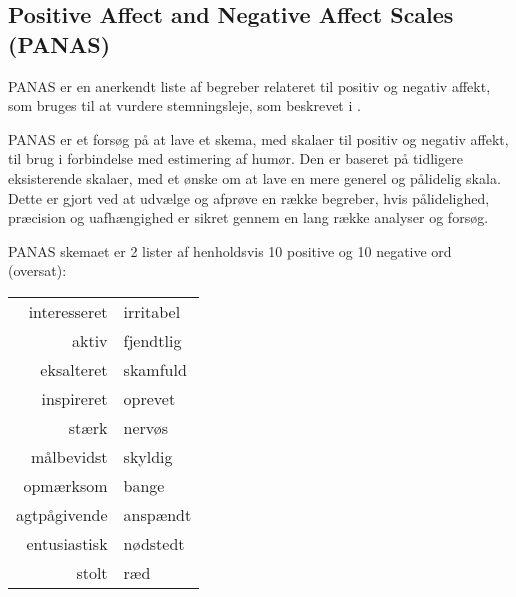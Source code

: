 \subsection{Positive Affect and Negative Affect Scales (PANAS)}
PANAS er en anerkendt liste af begreber relateret til positiv og negativ affekt, som bruges til at vurdere stemningsleje, som beskrevet i \citet{panas}.


PANAS er et forsøg på at lave et skema, med skalaer til positiv og negativ affekt, til brug i forbindelse med estimering af humør.
Den er baseret på tidligere eksisterende skalaer, med et ønske om at lave en mere generel og pålidelig skala.
Dette er gjort ved at udvælge og afprøve en række begreber, hvis pålidelighed, præcision og uafhængighed er sikret gennem en lang række analyser og forsøg.

PANAS skemaet er 2 lister af henholdsvis 10 positive og 10 negative ord (oversat):\\
\begin{center}
\begin{tabular}{r | l}
interesseret & irritabel \\\newline
aktiv & fjendtlig \\\newline
eksalteret & skamfuld \\\newline
inspireret & oprevet \\\newline
stærk & nervøs \\\newline
målbevidst & skyldig \\\newline
opmærksom & bange \\\newline
agtpågivende & anspændt \\\newline
entusiastisk & nødstedt \\\newline
stolt & ræd
\end{tabular}
\end{center}

